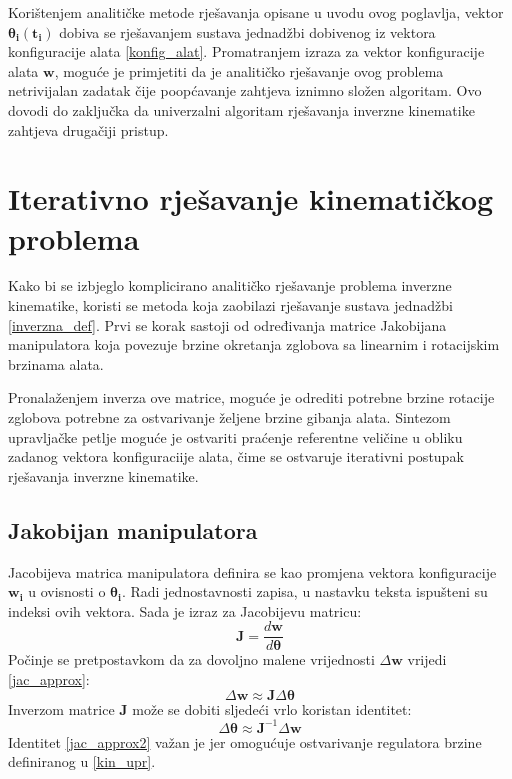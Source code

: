\documentclass[times, utf8, diplomski, numeric]{fer}
\begin{document}
Korištenjem analitičke metode rješavanja opisane u uvodu ovog poglavlja, vektor $\bm{\theta}_{\mathbf{i}}(\mathbf{t_i})$ dobiva se rješavanjem sustava jednadžbi dobivenog iz vektora konfiguracije alata \ref{konfig_alat}. 
Promatranjem izraza za vektor konfiguracije alata $\mathbf{w}$, moguće je primjetiti da je analitičko rješavanje ovog problema netrivijalan zadatak čije poopćavanje zahtjeva iznimno složen algoritam.
Ovo dovodi do zaključka da univerzalni algoritam rješavanja inverzne kinematike zahtjeva drugačiji pristup.

\section{Iterativno rješavanje kinematičkog problema}
Kako bi se izbjeglo komplicirano analitičko rješavanje problema inverzne kinematike, koristi se metoda koja zaobilazi rješavanje sustava jednadžbi \ref{inverzna_def}.
Prvi se korak sastoji od određivanja matrice Jakobijana manipulatora koja povezuje brzine okretanja zglobova sa linearnim i rotacijskim brzinama alata.

Pronalaženjem inverza ove matrice, moguće je odrediti potrebne brzine rotacije zglobova potrebne za ostvarivanje željene brzine gibanja alata.
Sintezom upravljačke petlje moguće je ostvariti praćenje referentne veličine u obliku zadanog vektora konfiguraciije alata, čime se ostvaruje iterativni postupak rješavanja inverzne kinematike.

\subsection{Jakobijan manipulatora}

Jacobijeva matrica manipulatora definira se kao promjena vektora konfiguracije $\mathbf{w_i}$ u ovisnosti o $\bm{\theta}_{\mathbf{i}}$.
Radi jednostavnosti zapisa, u nastavku teksta ispušteni su indeksi ovih vektora. 
Sada je izraz za Jacobijevu matricu:
\begin{equation}
\mathbf{J} =\frac{d\mathbf{w}}{d\bm{\theta}} \label{jakob}
\end{equation}
Počinje se pretpostavkom da za dovoljno malene vrijednosti $\Delta \mathbf{w}$ vrijedi \ref{jac_approx}:
\begin{equation}
\Delta \mathbf{w} \approx \mathbf{J}  \Delta \bm{\theta}
\label{jac_approx}
\end{equation}
Inverzom matrice $\mathbf{J}$ može se dobiti sljedeći vrlo koristan identitet:
\begin{equation}
\Delta \bm{\theta} \approx \mathbf{J}^{-1} \Delta \textbf{w}
\label{jac_approx2}
\end{equation}
Identitet \ref{jac_approx2} važan je jer omogućuje ostvarivanje regulatora brzine definiranog u \ref{kin_upr}.
\end{document}
